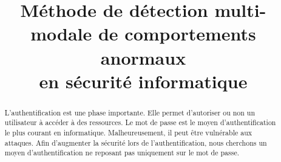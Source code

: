 \documentclass[conference,compsoc]{IEEEtran}
\begin{document}
%
\title{Méthode de détection multi-modale de comportements anormaux\\ en sécurité informatique}


\author{
\and
{}
\and
{}
\and
{}

}








\maketitle

\begin{abstract}
L'authentification est une phase importante. Elle permet d'autoriser ou non un utilisateur à accéder à des ressources. Le mot de passe est le moyen d'authentification le plus courant en informatique. Malheureusement, il peut être vulnérable aux attaques. Afin d'augmenter la sécurité lors de l'authentification, nous cherchons un moyen d'authentification ne reposant pas uniquement sur le mot de passe.
\end{abstract}





%
\IEEEpeerreviewmaketitle
\end{document}
